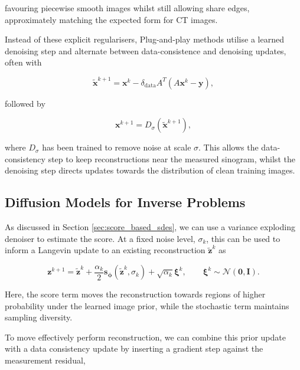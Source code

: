 favouring piecewise smooth images whilst still allowing share edges, approximately matching the expected form for CT images. 

Instead of these explicit regularisers, Plug-and-play methods utilise a learned denoising step and alternate between data-consistence and denoising updates, often with

\begin{equation}
\tilde{\mathbf{x}}^{k+1}
=
\mathbf{x}^k
-
\delta_{\mathrm{data}}A^T(A\mathbf{x}^k-\mathbf{y}),
\label{eq:pnp_data_update}
\end{equation}

followed by 

\begin{equation}
\mathbf{x}^{k+1}
=
D_\sigma(\tilde{\mathbf{x}}^{k+1}),
\label{eq:pnp_denoising_update}
\end{equation}

where $D_\sigma$ has been trained to remove noise at scale $\sigma$. This allows the data-consistency step to keep reconstructions near the measured sinogram, whilst the denoising step directs updates towards the distribution of clean training images.

\subsection{Diffusion Models for Inverse Problems}
\label{subsec:diffusion_models_inverse_problems}

As discussed in Section \ref{sec:score_based_sdes}, we can use a variance exploding denoiser to estimate the score. At a fixed noise level, $\sigma_k$, this can be used to inform a Langevin update to an existing reconstruction $\tilde{\mathbf{z}}^k$ as 

\begin{equation}
\mathbf{z}^{k+1}
=
\tilde{\mathbf{z}}^k
+
\frac{\alpha_k}{2}
\mathbf{s}_{\boldsymbol{\phi}}(\tilde{\mathbf{z}}^k,\sigma_k)
+
\sqrt{\alpha_k}\boldsymbol{\xi}^k,
\qquad
\boldsymbol{\xi}^k\sim\mathcal{N}(\mathbf{0},\mathbf{I}).
\label{eq:Langevin_step}
\end{equation}

Here, the score term moves the reconstruction towards regions of higher probability under the learned image prior, while the stochastic term maintains sampling diversity.

To move effectively perform reconstruction, we can combine this prior update with a data consistency update by inserting a gradient step against the measurement residual,

